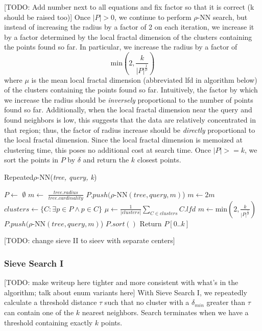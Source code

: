 [TODO: Add number next to all equations and fix factor so that it is correct (k should be raised too)]
Once $|P| > 0$, we continue to perform $\rho$-NN search, but instead of 
increasing the radius by a factor of 2 on each iteration, we increase it by a factor determined 
by the local fractal dimension of the clusters containing the points found so far. In particular, 
we increase the radius by a factor of 
$$\text{min}\left(2, \frac{k}{|P|^{\frac{1}{\mu}}}\right)$$
where $\mu$ is the mean local fractal dimension (abbreviated lfd in algorithm below) of the clusters containing the points found so far.
Intuitively, the factor by which we increase the radius should be \emph{inversely} proportional to the number of points found so far. 
Additionally, when the local fractal dimension near the query and found neighbors is low, this suggests that the data 
are relatively concentrated in that region; thus, the factor of radius increase should be \emph{directly} proportional to the 
local fractal dimension. Since the local fractal dimension is memoized at clustering time, this poses no additional cost at search time.
Once $|P| >= k$, we sort the points in $P$ by $\delta$ and return the $k$ closest points.

\begin{algorithm} %
    \caption{Repeated$\rho$-NN(\emph{tree, query, k})} %
    \label{alg:knn-by-rnn} %
    \begin{algorithmic}[4] %
        \STATE $P \leftarrow$ $\emptyset$
        \STATE $m \leftarrow$ $\frac{tree.radius}{tree.cardinality}$
            \STATE $P.push(\rho$-NN$(tree, query, m)$)
            \STATE $m \leftarrow 2m$
        \ENDWHILE
            \STATE $clusters \leftarrow \{ C: \exists p \in P \land p \in C \}$
            \STATE $\mu \leftarrow \frac{1}{|clusters|} \sum_{C \in clusters} C.lfd$
            \STATE $m \leftarrow \text{min}\left(2, \frac{k}{|P|^{\frac{1}{\mu}}}\right)$
            \STATE $P.push(\rho$-NN$(tree, query, m)$)
        \ENDWHILE
        \STATE $P.sort()$
        \STATE Return $P[0..k]$
    \end{algorithmic}
    \end{algorithm}


[TODO: change sieve II to sieev with separate centers]
\subsubsection{Sieve Search I}
\label{subsubsec:methods:knn-search:sieve}
[TODO: make writeup here tighter and more consistent with what's in the algorithm; talk 
about enum variants here]
With Sieve Search I, we repeatedly calculate a threshold distance $\tau$ such that no cluster with a $\delta_{min}$ greater than $\tau$ 
can contain one of the $k$ nearest neighbors. Search terminates when we have a threshold containing exactly $k$ points.

